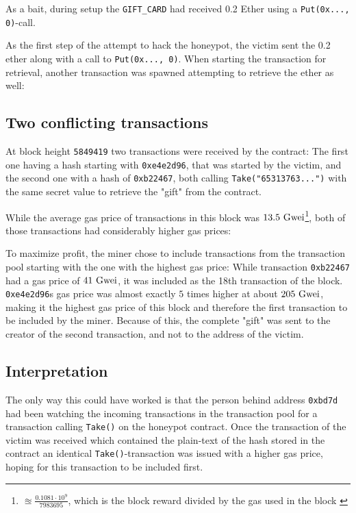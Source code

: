 As a bait, during setup the \texttt{GIFT_CARD} had received 0.2 Ether using a \texttt{Put(0x..., 0)}-call.

As the first step of the attempt to hack the honeypot, the victim sent the 0.2 ether along with a call to \texttt{Put(0x..., 0)}. When starting the transaction for retrieval, another transaction was spawned attempting to retrieve the ether as well:

\subsection{Two conflicting transactions} At block height \texttt{5849419} two transactions were received by the contract: The first one having a hash starting with \texttt{0xe4e2d96}, that was started by the victim, and the second one with a hash of \texttt{0xb22467}, both calling \texttt{Take("65313763...")} with the same secret value to retrieve the "gift" from the contract.

While the average gas price of transactions in this block was \( 13.5 \textnormal{ Gwei} \)\footnote{\( \approxeq \frac{0.1081 \cdot 10^9}{7983695} \), which is the block reward divided by the gas used in the block \cite{etherscan:giftcard}}, both of those transactions had considerably higher gas prices:

To maximize profit, the miner chose to include transactions from the transaction pool starting with the one with the highest gas price: While transaction \texttt{0xb22467} had a gas price of \( 41 \textnormal{ Gwei} \), it was included as the 18th transaction of the block. \texttt{0xe4e2d96}s gas price was almost exactly \( 5 \) times higher at about \( 205 \textnormal{ Gwei} \), making it the highest gas price of this block and therefore the first transaction to be included by the miner. Because of this, the complete "gift" was sent to the creator of the second transaction, and not to the address of the victim.

\subsection{Interpretation}
The only way this could have worked is that the person behind address \texttt{0xbd7d} had been watching the incoming transactions in the transaction pool for a transaction calling \texttt{Take()} on the honeypot contract. Once the transaction of the victim was received which contained the plain-text of the hash stored in the contract an identical \texttt{Take()}-transaction was issued with a higher gas price, hoping for this transaction to be included first.

